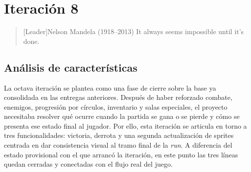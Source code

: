 \chapter{Iteración 8}

\begin{quotation}[Leader]{Nelson Mandela (1918--2013)}
It always seems impossible until it’s done.
\end{quotation}

\begin{abstract}
Esta iteración actúa como cierre funcional de la experiencia de partida. El trabajo se
centra en resolver los estados finales de victoria y derrota, además de completar una
segunda actualización visual orientada a los sprites de enemigos y a la cohesión general de
las pantallas finales con el resto de la interfaz.
\end{abstract}

\section{Análisis de características}
La octava iteración se plantea como una fase de cierre sobre la base ya consolidada en las
entregas anteriores. Después de haber reforzado combate, enemigos, progresión por círculos,
inventario y salas especiales, el proyecto necesitaba resolver qué ocurre cuando la partida
se gana o se pierde y cómo se presenta ese estado final al jugador. Por ello, esta iteración
se articula en torno a tres funcionalidades: victoria, derrota y una segunda actualización
de sprites centrada en dar consistencia visual al tramo final de la \textit{run}. A
diferencia del estado provisional con el que arrancó la iteración, en este punto las tres
líneas quedan cerradas y conectadas con el flujo real del juego.

